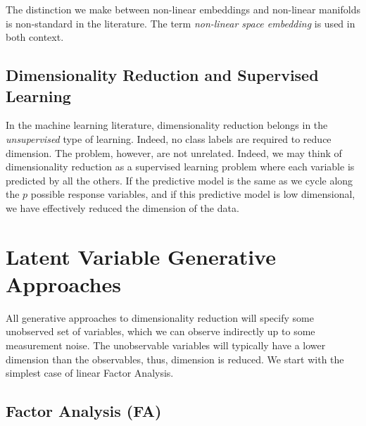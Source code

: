 \documentclass[12pt,a4paper]{article}
\begin{document}
\begin{remark}
	The distinction we make between non-linear embeddings and non-linear manifolds is non-standard in the literature. 
	The term \emph{non-linear space embedding} is used in both context. 
\end{remark}


\subsection{Dimensionality Reduction and Supervised Learning}
\label{sec:dim-reduce-and-supervised}

In the machine learning literature, dimensionality reduction belongs in the \emph{unsupervised} type of learning. 
Indeed, no class labels are required to reduce dimension.
The problem, however, are not unrelated. 
Indeed, we may think of dimensionality reduction as a supervised learning problem where each variable is predicted by all the others. 
If the predictive model is the same as we cycle along the $p$ possible response variables, and if this predictive model is low dimensional, we have effectively reduced the dimension of the data. 








\section{Latent Variable Generative Approaches}
All generative approaches to dimensionality reduction will specify some unobserved set of variables, which we can observe indirectly up to some measurement noise. 
The unobservable variables will typically have a lower dimension than the observables, thus, dimension is reduced. 
We start with the simplest case of linear Factor Analysis. 


\subsection{Factor Analysis (FA)}
\end{document}
